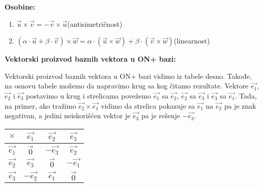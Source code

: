 \documentclass[12pt]{article}
\newcommand{\vek}[1]{\overrightarrow{#1}}
\begin{document}
\textbf{Osobine:}
\begin{enumerate}[label=\textbf{(\arabic*)}]
    \item $\vek{u}\times\vek{v}=-\vek{v}\times\vek{u}$\hspace*{1cm}(antisimetričnost)
    \item $(\alpha\cdot\vek{u}+\beta\cdot\vek{v})\times\vek{w}=\alpha\cdot(\vek{u}\times\vek{w})+\beta\cdot(\vek{v}\times\vek{w})$\hspace*{1cm}(linearnost)
\end{enumerate}
\par

\textbf{Vektorski proizvod baznih vektora u ON+ bazi:}\\[0.1cm]
\noindent
\begin{minipage}{0.65\textwidth}
    \begin{flushleft}
        Vektorski proizvod baznih vektora u ON+ bazi vidimo iz tabele desno.
        Takođe, na osnovu tabele možemo da napravimo krug sa kog čitamo
        rezultate. Vektore $\vek{e_1}$, $\vek{e_2}$ i $\vek{e_3}$ postavimo u
        krug i strelicama povežemo $\vek{e_1}$ sa $\vek{e_2}$, $\vek{e_2}$ sa
        $\vek{e_3}$ i $\vek{e_3}$ sa $\vek{e_1}$. Tada, na primer, ako tražimo
        $\vek{e_2}\times\vek{e_1}$ vidimo da strelica pokazuje sa $\vek{e_1}$
        na $\vek{e_2}$ pa je znak negativan, a jedini neiskorišćen vektor je
        $\vek{e_3}$ pa je rešenje $-\vek{e_3}$.
    \end{flushleft}
\end{minipage}
\hfill
\begin{minipage}{0.3\textwidth}
    \centering
    \begin{tabular}{|c|c|c|c|}
        \hline
        $\times$    & $\vek{e_1}$  & $\vek{e_2}$  & $\vek{e_3}$  \\
        \hline
        $\vek{e_1}$ & $\vek{0}$    & $-\vek{e_3}$ & $\vek{e_2}$  \\
        \hline
        $\vek{e_2}$ & $\vek{e_3}$  & $\vek{0}$    & $-\vek{e_1}$ \\
        \hline
        $\vek{e_3}$ & $-\vek{e_2}$ & $\vek{e_1}$  & $\vek{0}$    \\
        \hline
    \end{tabular}
\end{minipage}
\par
\end{document}
